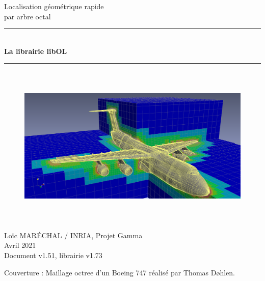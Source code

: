 \documentclass[a4paper,12pt]{article}
\newcommand{\HRule}{\rule{\linewidth}{1mm}}
\begin{document}
%
%

\begin{titlepage}

\begin{center}
\huge Localisation géométrique rapide \\ par arbre octal
\HRule \\
\medskip
{\Huge \bfseries La librairie libOL} \\
\HRule
\end{center}


\begin{figure}[htbp]
\begin{center}
\includegraphics[height=7.8cm]{octree_mesh.png}
\end{center}
\end{figure}


\begin{flushright}
\Large Lo\"ic MAR\'ECHAL / INRIA, Projet Gamma\\
\Large Avril 2021 \\
\normalsize Document v1.51, librairie v1.73
\end{flushright}

\end{titlepage}

\clearpage

\setcounter{tocdepth}{2}
\tableofcontents
\vfill

\footnotesize{Couverture : Maillage octree d'un Boeing 747 réalisé par Thomas Døhlen.}
\normalsize

\clearpage


%
%
\end{document}
